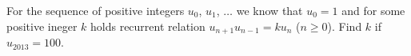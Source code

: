 \problem{}
For the sequence of positive integers $u_0$, $u_1$, $\ldots$ we know that
$u_0 = 1$ and for some positive ineger $k$ holds recurrent relation $u_{n+1} u_{n-1} = k u_n$ ($n \geq 0$).
Find $k$ if $u_{2013} = 100$.
\solution
\endproblem
